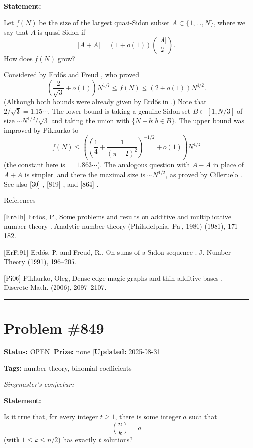 \documentclass{article}
\begin{document}
\noindent\textbf{Statement:}

Let $f(N)$ be the size of the largest quasi-Sidon subset $A\subset\{1,\ldots,N\}$, where we say that $A$ is quasi-Sidon if\[\lvert A+A\rvert=(1+o(1))\binom{\lvert A\rvert}{2}.\]How does $f(N)$ grow?




Considered by Erd\H{o}s and Freud \cite{ErFr91}, who proved\[\left(\frac{2}{\sqrt{3}}+o(1)\right)N^{1/2} \leq f(N) \leq \left(2+o(1)\right)N^{1/2}.\](Although both bounds were already given by Erd\H{o}s in \cite{Er81h}.) Note that $2/\sqrt{3}=1.15\cdots$. The lower bound is taking a genuine Sidon set $B\subset [1,N/3]$ of size $\sim N^{1/2}/\sqrt{3}$ and taking the union with $\{N-b : b\in B\}$. The upper bound was improved by Pikhurko \cite{Pi06} to\[f(N) \leq \left(\left(\frac{1}{4}+\frac{1}{(\pi+2)^2}\right)^{-1/2}+o(1)\right)N^{1/2}\](the constant here is $=1.863\cdots$). The analogous question with $A-A$ in place of $A+A$ is simpler, and there the maximal size is $\sim N^{1/2}$, as proved by Cilleruelo . See also [30] , [819] , and [864] .




References

[Er81h] Erd\H{o}s, P., Some problems and results on additive and multiplicative number theory . Analytic number theory (Philadelphia, Pa., 1980) (1981), 171-182.

[ErFr91] Erd\H{o}s, P. and Freud, R., On sums of a Sidon-sequence . J. Number Theory (1991), 196--205.

[Pi06] Pikhurko, Oleg, Dense edge-magic graphs and thin additive bases . Discrete Math. (2006), 2097--2107.

\noindent\rule{\linewidth}{0.4pt}


\section{Problem \#849}
\label{prob:849}

\noindent\textbf{Status:} OPEN \quad|\quad \textbf{Prize:} none \quad|\quad \textbf{Updated:} 2025-08-31

\noindent\textbf{Tags:} number theory, binomial coefficients

\medskip
\noindent\textit{Singmaster's conjecture}


\noindent\textbf{Statement:}

Is it true that, for every integer $t\geq 1$, there is some integer $a$ such that\[\binom{n}{k}=a\](with $1\leq k\leq n/2$) has exactly $t$ solutions?
\end{document}
